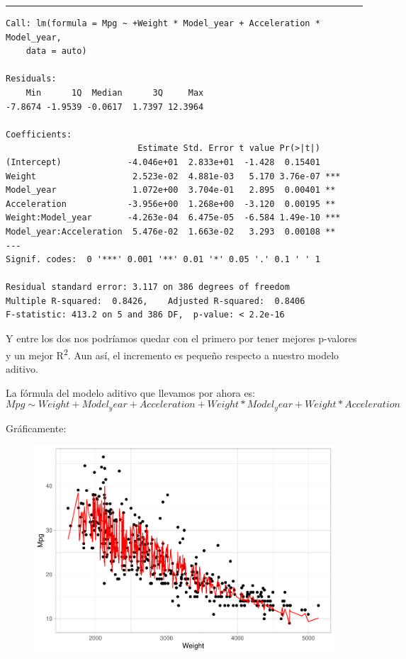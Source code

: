 \begin{center}\rule{\linewidth}{0.5pt}\end{center}

\begin{verbatim}
Call: lm(formula = Mpg ~ +Weight * Model_year + Acceleration * Model_year, 
    data = auto)

Residuals:
    Min      1Q  Median      3Q     Max 
-7.8674 -1.9539 -0.0617  1.7397 12.3964 

Coefficients:
                          Estimate Std. Error t value Pr(>|t|)    
(Intercept)             -4.046e+01  2.833e+01  -1.428  0.15401    
Weight                   2.523e-02  4.881e-03   5.170 3.76e-07 ***
Model_year               1.072e+00  3.704e-01   2.895  0.00401 ** 
Acceleration            -3.956e+00  1.268e+00  -3.120  0.00195 ** 
Weight:Model_year       -4.263e-04  6.475e-05  -6.584 1.49e-10 ***
Model_year:Acceleration  5.476e-02  1.663e-02   3.293  0.00108 ** 
---
Signif. codes:  0 '***' 0.001 '**' 0.01 '*' 0.05 '.' 0.1 ' ' 1

Residual standard error: 3.117 on 386 degrees of freedom
Multiple R-squared:  0.8426,    Adjusted R-squared:  0.8406 
F-statistic: 413.2 on 5 and 386 DF,  p-value: < 2.2e-16
\end{verbatim}

Y entre los dos nos podríamos quedar con el primero por tener mejores p-valores y un mejor R\textsuperscript{2}. Aun así, el incremento es pequeño respecto a nuestro modelo aditivo.

\vspace{\baselineskip}

La fórmula del modelo aditivo que llevamos por ahora es:
\begin{equation}
    Mpg \sim Weight + Model_year + Acceleration + Weight*Model_year + Weight*Acceleration
\end{equation}

Gráficamente:
\begin{figure}[H]\includegraphics[width=.89\linewidth]{img/Regresion_files/figure-latex/unnamed-chunk-16-1} \caption{}\end{figure}


